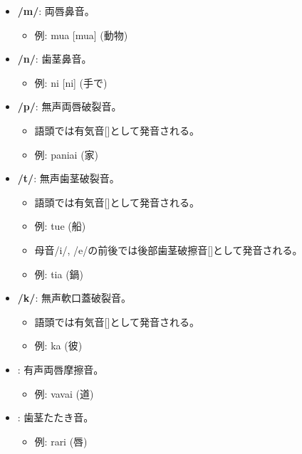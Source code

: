 \begin{itemize}
    \item \textbf{/m/}: 両唇鼻音。
    \begin{itemize}
        \item 例: mua [mua] (動物)
    \end{itemize}

    \item \textbf{/n/}: 歯茎鼻音。
    \begin{itemize}
        \item 例: ni [ni] (手で)
    \end{itemize}

    \item \textbf{/p/}: 無声両唇破裂音。
    \begin{itemize}
        \item 語頭では有気音[]として発音される。
        \item 例:  paniai  (家)
    \end{itemize}

    \item \textbf{/t/}: 無声歯茎破裂音。
    \begin{itemize}
        \item 語頭では有気音[]として発音される。
        \item 例: tue \textipa{[t\super{h}ue]} (船)
        \item 母音/i/, /e/の前後では後部歯茎破擦音[]として発音される。
        \item 例: tia \textipa{[tS\super{h}ia]} (鍋)
    \end{itemize}

    \item \textbf{/k/}: 無声軟口蓋破裂音。
    \begin{itemize}
        \item 語頭では有気音[]として発音される。
        \item 例: ka \textipa{[k\super{h}a]} (彼)
    \end{itemize}

    
\item \textbf{}: 有声両唇摩擦音。
    \begin{itemize}
        \item 例: vavai \textipa{[BaBai]} (道)
    \end{itemize}
    
    \item \textbf{}: 歯茎たたき音。
    \begin{itemize}
        \item 例: rari \textipa{[RaRi]} (唇)
    \end{itemize}
\end{itemize}